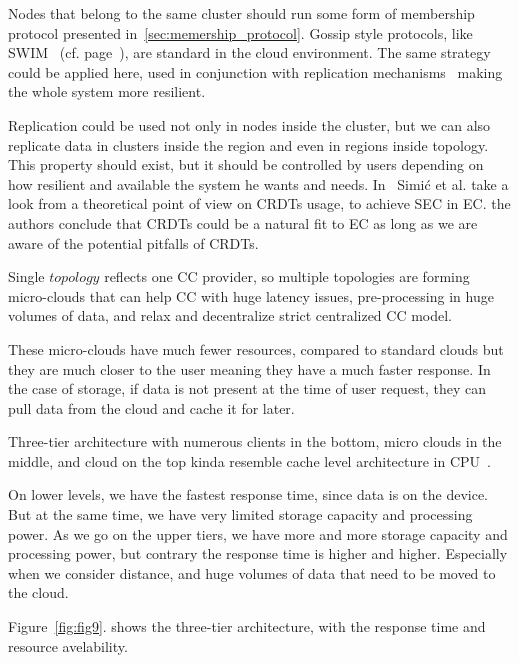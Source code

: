 Nodes that belong to the same cluster should run some form of membership protocol presented in~\ref{sec:memership_protocol}. Gossip style protocols, like SWIM~\cite{DasGM02} (cf. page~\pageref{swim}), are standard in the cloud environment. The same strategy could be applied here, used in conjunction with replication mechanisms~\cite{LiBCL20, CauCBFCEB16, CRDTS_Nuno} making the whole system more resilient. 

Replication could be used not only in nodes inside the cluster, but we can also replicate data in clusters inside the region and even in regions inside topology. This property should exist, but it should be controlled by users depending on how resilient and available the system he wants and needs. In~\cite{inproceedingsSimic2} Simi\' c et al. take a look from a theoretical point of view on CRDTs usage, to achieve SEC in EC. the authors conclude that CRDTs could be a natural fit to EC as long as we are aware of the potential pitfalls of CRDTs.

Single $topology$ reflects one CC provider, so multiple topologies are forming micro-clouds that can help CC with huge latency issues, pre-processing in huge volumes of data, and relax and decentralize strict centralized CC model.

These micro-clouds have much fewer resources, compared to standard clouds but they are much closer to the user meaning they have a much faster response. In the case of storage, if data is not present at the time of user request, they can pull data from the cloud and cache it for later.

Three-tier architecture with numerous clients in the bottom, micro clouds in the middle, and cloud on the top kinda resemble cache level architecture in CPU~\cite{FarshinRMK19}. 

On lower levels, we have the fastest response time, since data is on the device. But at the same time, we have very limited storage capacity and processing power. As we go on the upper tiers, we have more and more storage capacity and processing power, but contrary the response time is higher and higher.  Especially when we consider distance, and huge volumes of data that need to be moved to the cloud.

Figure~\ref{fig:fig9}. shows the three-tier architecture, with the response time and resource avelability.

